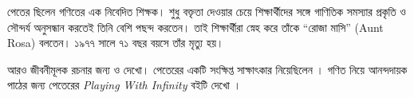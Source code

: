 \documentclass[../../../include/open-logic-section]{subfiles}
\begin{document}
পেতের ছিলেন গণিতের এক নিবেদিত শিক্ষক।
শুধু বক্তৃতা দেওয়ার চেয়ে শিক্ষার্থীদের সঙ্গে
গাণিতিক সমস্যার প্রকৃতি ও সৌন্দর্য অনুসন্ধান
করতেই তিনি বেশি পছন্দ করতেন। তাই
শিক্ষার্থীরা স্নেহ করে তাঁকে “রোজা মাসি”
(Aunt Rosa) বলতেন। ১৯৭৭ সালে ৭১ বছর
বয়সে তাঁর মৃত্যু হয়।

\begin{reading}
আরও জীবনীমূলক রচনার জন্য \citep{Oconnor2014}
ও \citep{Andrasfai1986} দেখো। পেতেরের একটি
সংক্ষিপ্ত সাক্ষাৎকার নিয়েছিলেন
\citet{Tamassy1994}। গণিত নিয়ে আনন্দদায়ক
পাঠের জন্য পেতেরের \emph{Playing With Infinity}
বইটি দেখো \citep{Peter2010}।
\end{reading}
\end{document}

